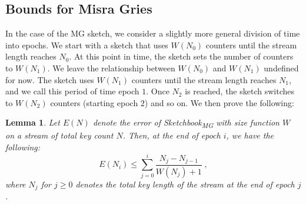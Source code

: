 \documentclass[sigconf]{acmart}
\newtheorem{lemma}[theorem]{Lemma}
\newcommand{\sketch}{Sketchbook}
\newcommand{\sketchmg}{\sketch\textsubscript{MG}\xspace}
\begin{document}
\subsection{Bounds for Misra Gries}

In the case of the MG sketch, we consider a slightly more general division of time into epochs. We start with a sketch that uses $W(N_0)$ counters until the stream length reaches $N_0$. At this point in time, the sketch sets the number of counters to $W(N_1)$. We leave the relationship between $W(N_0)$ and $W(N_1)$ undefined for now. The sketch uses $W(N_1)$ counters until the stream length reaches $N_1$, and we call this period of time epoch $1$.  Once $N_2$ is reached, the sketch switches to $W(N_2)$ counters (starting epoch $2$) and so on. We then prove the following:

\begin{lemma}\label{lemma:mg-w}
Let $E(N)$  denote the error of \sketchmg with size function $W$ on a stream of total key count $N$. Then, at the end of epoch $i$, we have the following:
$$E(N_i)\leq \sum_{j=0}^i  \frac{N_j - N_{j-1}}{W(N_j)+1}   \;,$$
where $N_{j}$ for $j\geq 0$ denotes the total key length of the stream at the end of epoch $j$. 
\end{lemma}
\end{document}
